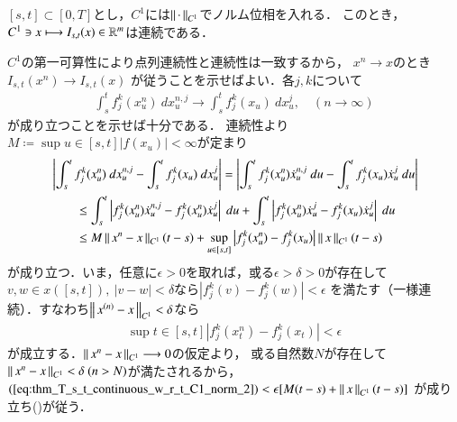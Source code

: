 \begin{screen}
	\begin{thm}\label{thm:T_s_t_continuous_w_r_t_C1_norm}
		$[s,t] \subset [0,T]$とし，$C^1$には$\left\|\, \cdot\, \right\|_{C^1}$でノルム位相を入れる．
		このとき，$C^1 \ni x \longmapsto I_{s,t}(x) \in \mathbb{R}^m$は連続である．
	\end{thm}
\end{screen}

\begin{prf}
	$C^1$の第一可算性により点列連続性と連続性は一致するから，
	$x^n \longrightarrow x$のとき$I_{s,t}(x^n) \longrightarrow I_{s,t}(x)$
	が従うことを示せばよい．各$j,k$について
	\begin{align}
		\int_s^t f^k_j(x^n_u)\ dx^{n,j}_u
		\longrightarrow \int_s^t f^k_j(x_u)\ dx^j_u,
		\quad (n \longrightarrow \infty)
		\label{eq:thm_T_s_t_continuous_w_r_t_C1_norm}
	\end{align}
	が成り立つことを示せば十分である．
	連続性より$M \coloneqq \sup{u \in [s,t]}{|f(x_u)|} < \infty$が定まり
	\begin{align}
		&\left| \int_s^t f^k_j(x^n_u)\ dx^{n,j}_u
			- \int_s^t f^k_j(x_u)\ dx^j_u \right|
		= \left| \int_s^t f^k_j(x^n_u)\dot{x}^{n,j}_u\ du
			- \int_s^t f^k_j(x_u)\dot{x}^j_u\ du \right| \\
		&\qquad \leq \int_s^t \left| f^k_j(x^n_u)\dot{x}^{n,j}_u - f^k_j(x^n_u)\dot{x}^j_u \right|\ du
			+ \int_s^t \left| f^k_j(x^n_u)\dot{x}^j_u - f^k_j(x_u)\dot{x}^j_u \right|\ du \\
		&\qquad \leq M \left\|\, x^n - x\, \right\|_{C^1} (t-s)
			+ \operatorname*{sup}_{u \in [s,t]} \left| f^k_j(x^n_u) - f^k_j(x_u) \right| \left\|\, x\, \right\|_{C^1}(t-s)
			\label{eq:thm_T_s_t_continuous_w_r_t_C1_norm_2}
	\end{align}
	が成り立つ．いま，任意に$\epsilon > 0$を取れば，或る$\epsilon > \delta > 0$が存在して
	$v,w \in x([s,t]),\ |v - w| < \delta$なら$|f^k_j(v) - f^k_j(w)| < \epsilon$
	を満たす（一様連続）．すなわち$\left\|\, x^{(n)} - x\, \right\|_{C^1} < \delta$なら
	\begin{align}
		\sup{t \in [s,t]}{\left|f^k_j(x^n_t) - f^k_j(x_t) \right|} < \epsilon
	\end{align}
	が成立する．$\left\|\, x^n - x\, \right\|_{C^1} \longrightarrow 0$の仮定より，
	或る自然数$N$が存在して$\left\|\, x^n - x\, \right\|_{C^1} < \delta\ (n > N)$が満たされるから，
	$(\refeq{eq:thm_T_s_t_continuous_w_r_t_C1_norm_2}) < \epsilon[M(t-s) + \Norm{x}{C^1}(t-s)]$
	が成り立ち()が従う．
	\QED
\end{prf}

